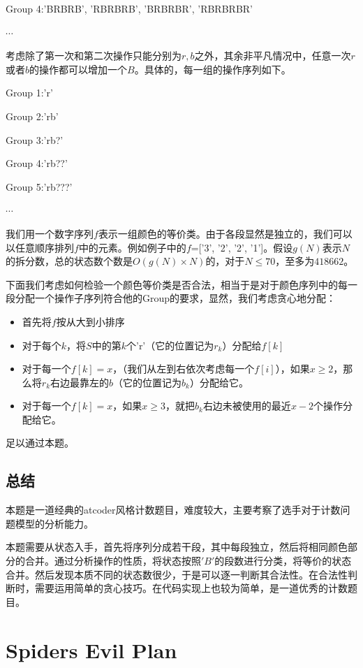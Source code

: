 \documentclass[12pt]{article}
\begin{document}
Group 4:'BRBRB', 'RBRBRB', 'BRBRBR', 'RBRBRBR'

$\cdots$

考虑除了第一次和第二次操作只能分别为$r,b$之外，其余非平凡情况中，任意一次$r$或者$b$的操作都可以增加一个$B$。具体的，每一组的操作序列如下。

Group 1:'r'

Group 2:'rb'

Group 3:'rb?'

Group 4:'rb??'

Group 5:'rb???'

$\cdots$

我们用一个数字序列$f$表示一组颜色的等价类。由于各段显然是独立的，我们可以以任意顺序排列$f$中的元素。例如例子中的$f$=['3', '2', '2', '1']。假设$g(N)$表示$N$的拆分数，总的状态数个数是$O(g(N)\times N)$的，对于$N\le 70$，至多为$418662$。

下面我们考虑如何检验一个颜色等价类是否合法，相当于是对于颜色序列中的每一段分配一个操作子序列符合他的Group的要求，显然，我们考虑贪心地分配：
\begin{itemize}
  \item 首先将$f$按从大到小排序
  \item 对于每个$k$，将$S$中的第$k$个'r'（它的位置记为$r_k$）分配给$f[k]$
  \item 对于每一个$f[k]=x$，（我们从左到右依次考虑每一个$f[i]$），如果$x\ge 2$，那么将$r_k$右边最靠左的$b$（它的位置记为$b_k$）分配给它。
  \item 对于每一个$f[k]=x$，如果$x\ge 3$，就把$b_k$右边未被使用的最近$x-2$个操作分配给它。
\end{itemize}

足以通过本题。

\subsection{总结}
本题是一道经典的atcoder风格计数题目，难度较大，主要考察了选手对于计数问题模型的分析能力。

本题需要从状态入手，首先将序列分成若干段，其中每段独立，然后将相同颜色部分的合并。通过分析操作的性质，将状态按照$'B'$的段数进行分类，将等价的状态合并。然后发现本质不同的状态数很少，于是可以逐一判断其合法性。在合法性判断时，需要运用简单的贪心技巧。在代码实现上也较为简单，是一道优秀的计数题目。

\newpage

\section{Spiders Evil Plan}
\end{document}
